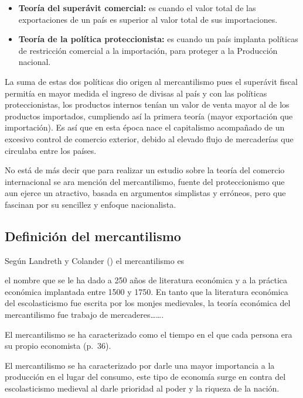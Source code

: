 \documentclass[
  stu,
  floatsintext,
  longtable,
  a4paper,
  nolmodern,
  notxfonts,
  notimes,
  12pt,
  colorlinks=true,linkcolor=blue,citecolor=blue,urlcolor=blue]{apa7}
\providecommand{\tightlist}{%
  \setlength{\itemsep}{0pt}\setlength{\parskip}{0pt}}
\begin{document}
\begin{itemize}
\tightlist
\item
  \hspace{0pt} \textbf{Teoría del superávit comercial:} es cuando el
  valor total de las exportaciones de un país es superior al valor total
  de sus importaciones.
\item
  \hspace{0pt} \textbf{Teoría de la política proteccionista:} es cuando
  un país implanta políticas de restricción comercial a la importación,
  para proteger a la Producción nacional.
\end{itemize}

La suma de estas dos políticas dio origen al mercantilismo pues el
superávit fiscal permitía en mayor medida el ingreso de divisas al país
y con las políticas proteccionistas, los productos internos tenían un
valor de venta mayor al de los productos importados, cumpliendo así la
primera teoría (mayor exportación que importación). Es así que en esta
época nace el capitalismo acompañado de un excesivo control de comercio
exterior, debido al elevado flujo de mercaderías que circulaba entre los
países.

No está de más decir que para realizar un estudio sobre la teoría del
comercio internacional se ara mención del mercantilismo, fuente del
proteccionismo que aun ejerce un atractivo, basada en argumentos
simplistas y erróneos, pero que fascinan por su sencillez y enfoque
nacionalista.

\subsection{Definición del
mercantilismo}\label{definiciuxf3n-del-mercantilismo}

Según Landreth y Colander
() el
mercantilismo es

el nombre que se le ha dado a 250 años de literatura económica y a la
práctica económica implantada entre 1500 y 1750. En tanto que la
literatura económica del escolasticismo fue escrita por los monjes
medievales, la teoría económica del mercantilismo fue trabajo de
mercaderes\ldots\ldots.

El mercantilismo se ha caracterizado como el tiempo en el que cada
persona era su propio economista (p.~36).

El mercantilismo se ha caracterizado por darle una mayor importancia a
la producción en el lugar del consumo, este tipo de economía surge en
contra del escolasticismo medieval al darle prioridad al poder y la
riqueza de la nación.
\end{document}
